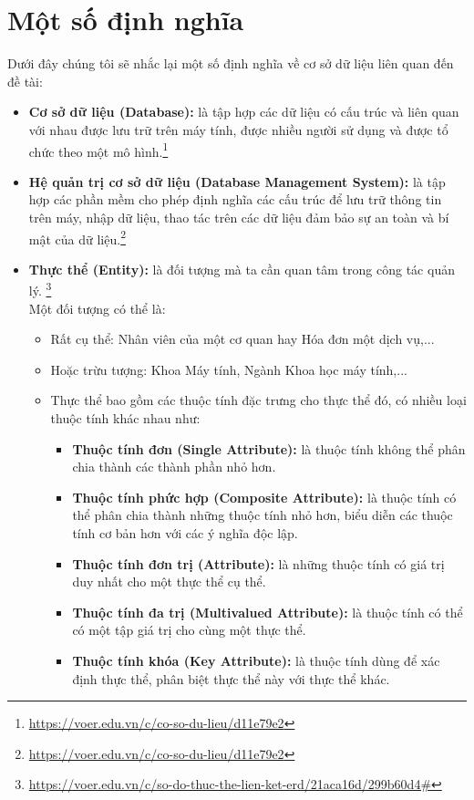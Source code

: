 \documentclass[12pt]{report}
\begin{document}
		\section{Một số định nghĩa}
		\par Dưới đây chúng tôi sẽ nhắc lại một số định nghĩa về cơ sở dữ liệu liên quan đến đề tài:
			\begin{itemize}
			\item{\textbf{Cơ sở dữ liệu (Database):}} là tập hợp các dữ liệu có cấu trúc và liên quan với nhau được lưu trữ trên máy tính, được nhiều người sử dụng và được tổ chức theo một mô hình.\footnote{\url{https://voer.edu.vn/c/co-so-du-lieu/d11e79e2}}
			\item{\textbf{Hệ quản trị cơ sở dữ liệu (Database Management System):}} là tập hợp các phần mềm cho phép định nghĩa các cấu trúc để lưu trữ thông tin trên máy, nhập dữ liệu, thao tác trên các dữ liệu đảm bảo sự an toàn và bí mật của dữ liệu.\footnote{\url{https://voer.edu.vn/c/co-so-du-lieu/d11e79e2}}
			\item{\textbf{Thực thể (Entity):}} là đối tượng mà ta cần quan tâm trong công tác quản lý. \footnote{\url{https://voer.edu.vn/c/so-do-thuc-the-lien-ket-erd/21aca16d/299b60d4\#}}\\
			Một đối tượng có thể là:
				\begin{itemize}
					\item{Rất cụ thể: }Nhân viên của một cơ quan hay Hóa đơn một dịch vụ,...
					\item{Hoặc trừu tượng: }Khoa Máy tính, Ngành Khoa học máy tính,...
					\item{Thực thể bao gồm các thuộc tính đặc trưng cho thực thể đó, có nhiều loại thuộc tính khác nhau như:}
					\begin{itemize}
						\item{\textbf{Thuộc tính đơn (Single Attribute):}} là thuộc tính không thể phân chia thành các thành phần nhỏ hơn.
						\item{\textbf{Thuộc tính phức hợp (Composite Attribute):}} là thuộc tính có thể phân chia thành những thuộc tính nhỏ hơn, biểu diễn các thuộc tính cơ bản hơn với các ý nghĩa độc lập.
						\item{\textbf{Thuộc tính đơn trị (Attribute):}} là những thuộc tính có giá trị duy nhất cho một thực thể cụ thể.
						\item{\textbf{Thuộc tính đa trị (Multivalued Attribute):}} là thuộc tính có thể có một tập giá trị cho cùng một thực thể.
						\item{\textbf{Thuộc tính khóa (Key Attribute):}} là thuộc tính dùng để xác định thực thể, phân biệt thực thể này với thực thể khác.

\end{itemize}
\end{itemize}
\end{itemize}
\end{document}
